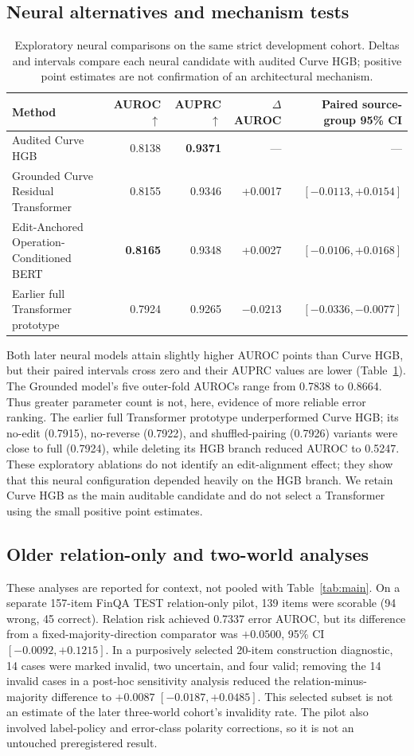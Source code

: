 \documentclass[11pt]{article}
\begin{document}
\subsection{Neural alternatives and mechanism tests}\label{sec:neural-results}
\begin{table}[t]
\centering
\small
\caption{Exploratory neural comparisons on the same strict development cohort. Deltas and intervals compare each neural candidate with audited Curve HGB; positive point estimates are not confirmation of an architectural mechanism.}
\label{tab:neural}
\begin{tabular}{lrrrr}
\toprule
Method & AUROC $\uparrow$ & AUPRC $\uparrow$ & $\Delta$AUROC & Paired source-group 95\% CI \\
\midrule
Audited Curve HGB & 0.8138 & \textbf{0.9371} & --- & --- \\
Grounded Curve Residual Transformer & 0.8155 & 0.9346 & +0.0017 & $[-0.0113,+0.0154]$ \\
Edit-Anchored Operation-Conditioned BERT & \textbf{0.8165} & 0.9348 & +0.0027 & $[-0.0106,+0.0168]$ \\
Earlier full Transformer prototype & 0.7924 & 0.9265 & $-0.0213$ & $[-0.0336,-0.0077]$ \\
\bottomrule
\end{tabular}
\end{table}

Both later neural models attain slightly higher AUROC points than Curve HGB, but their paired intervals cross zero and their AUPRC values are lower (Table~\ref{tab:neural}). The Grounded model's five outer-fold AUROCs range from 0.7838 to 0.8664. Thus greater parameter count is not, here, evidence of more reliable error ranking. The earlier full Transformer prototype underperformed Curve HGB; its no-edit (0.7915), no-reverse (0.7922), and shuffled-pairing (0.7926) variants were close to full (0.7924), while deleting its HGB branch reduced AUROC to 0.5247. These exploratory ablations do not identify an edit-alignment effect; they show that this neural configuration depended heavily on the HGB branch. We retain Curve HGB as the main auditable candidate and do not select a Transformer using the small positive point estimates.

\subsection{Older relation-only and two-world analyses}
These analyses are reported for context, not pooled with Table~\ref{tab:main}. On a separate 157-item FinQA TEST relation-only pilot, 139 items were scorable (94 wrong, 45 correct). Relation risk achieved 0.7337 error AUROC, but its difference from a fixed-majority-direction comparator was $+0.0500$, 95\% CI $[-0.0092,+0.1215]$. In a purposively selected 20-item construction diagnostic, 14 cases were marked invalid, two uncertain, and four valid; removing the 14 invalid cases in a post-hoc sensitivity analysis reduced the relation-minus-majority difference to $+0.0087$ $[-0.0187,+0.0485]$. This selected subset is not an estimate of the later three-world cohort's invalidity rate. The pilot also involved label-policy and error-class polarity corrections, so it is not an untouched preregistered result.
\end{document}
